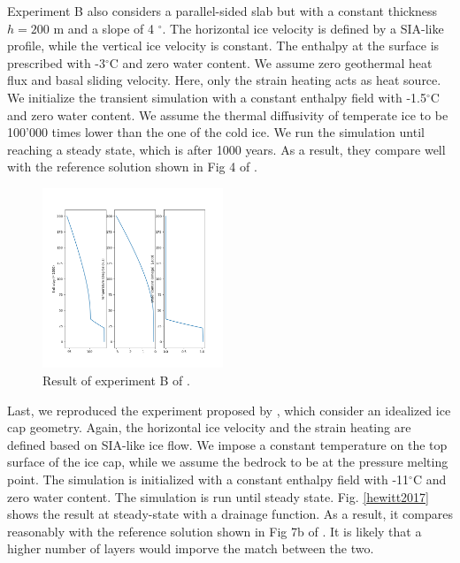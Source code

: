 \documentclass[gmd]{copernicus}
\begin{document}
Experiment B also considers a parallel-sided slab but with a constant thickness $h=200$ m
and a slope of 4 $^{\circ}$. The horizontal ice velocity is defined by a SIA-like profile, 
while the vertical ice velocity is constant. 
The enthalpy at the surface is prescribed with -3$^{\circ}$C and zero water content.
We assume zero geothermal heat flux and basal sliding velocity.
Here, only the strain heating acts as heat source. We initialize 
the transient simulation with a constant enthalpy field with -1.5$^{\circ}$C 
and zero water content. We assume the thermal diffusivity of temperate ice to be 
100'000 times lower than the one of the cold ice. We run the simulation until
reaching a steady state, which is after 1000 years.
As a result, they compare well with 
the reference solution shown in Fig 4 of \citep{kleiner2015enthalpy}. 

\begin{figure}[!h]
\begin{center} 
\includegraphics[width=0.48\textwidth]{fig/KleinerExpB.png}   
\end{center}
\caption{ Result of experiment B of \citep{kleiner2015enthalpy}. \label{KleinerExpB}}
\end{figure}

Last, we reproduced the experiment proposed by \citet{hewitt2017models},
which consider an idealized ice cap geometry. Again, the horizontal ice velocity 
and the strain heating are defined based on SIA-like ice flow. We impose 
a constant temperature on the top surface of the ice cap, while we assume 
the bedrock to be at the pressure melting point. The simulation is initialized 
with a constant enthalpy field  with -11$^{\circ}$C and zero water content.
The simulation is run until steady state.
Fig. \eqref{hewitt2017} shows the result at steady-state with a drainage function.
As a result, it compares reasonably with the reference solution shown in Fig 7b 
of \citep{hewitt2017models}. It is likely that a higher number of layers would
imporve the match between the two.
\end{document}
